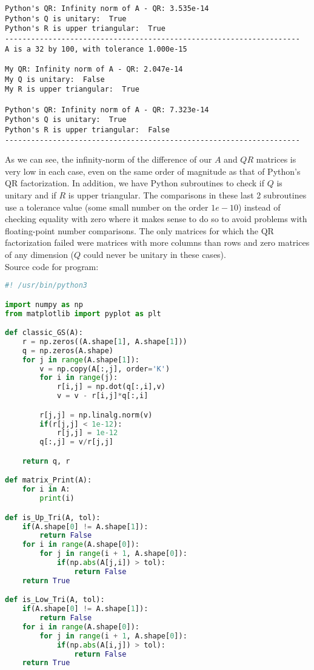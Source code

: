 \documentclass{article}
\begin{document}
\begin{large}
\begin{lstlisting}
Python's QR: Infinity norm of A - QR: 3.535e-14
Python's Q is unitary:  True
Python's R is upper triangular:  True
--------------------------------------------------------------------
A is a 32 by 100, with tolerance 1.000e-15

My QR: Infinity norm of A - QR: 2.047e-14
My Q is unitary:  False
My R is upper triangular:  True

Python's QR: Infinity norm of A - QR: 7.323e-14
Python's Q is unitary:  True
Python's R is upper triangular:  False
--------------------------------------------------------------------
\end{lstlisting}
As we can see, the infinity-norm of the difference of our $A$ and $QR$ matrices is very low in each case, even on the same order of magnitude as that of Python's QR factorization. In addition, we have Python subroutines to check if $Q$ is unitary and if $R$ is upper triangular. The comparisons in these last 2 subroutines use a tolerance value (some small number on the order $1e-10$) instead of checking equality with zero where it makes sense to do so to avoid problems with floating-point number comparisons. The only matrices for which the QR factorization failed were matrices with more columns than rows and zero matrices of any dimension ($Q$ could never be unitary in these cases). \\
\noindent\makebox[\linewidth]{\rule{\paperwidth}{0.4pt}}
Source code for program:
\begin{lstlisting}[language=python]
#! /usr/bin/python3

import numpy as np
from matplotlib import pyplot as plt

def classic_GS(A):
	r = np.zeros((A.shape[1], A.shape[1]))
	q = np.zeros(A.shape)
	for j in range(A.shape[1]):
		v = np.copy(A[:,j], order='K')
		for i in range(j):
			r[i,j] = np.dot(q[:,i],v)
			v = v - r[i,j]*q[:,i]

		r[j,j] = np.linalg.norm(v)
		if(r[j,j] < 1e-12):
			r[j,j] = 1e-12
		q[:,j] = v/r[j,j]

	return q, r

def matrix_Print(A):
	for i in A:
		print(i)

def is_Up_Tri(A, tol):
	if(A.shape[0] != A.shape[1]):
		return False
	for i in range(A.shape[0]):
		for j in range(i + 1, A.shape[0]):
			if(np.abs(A[j,i]) > tol):
				return False
	return True

def is_Low_Tri(A, tol):
	if(A.shape[0] != A.shape[1]):
		return False
	for i in range(A.shape[0]):
		for j in range(i + 1, A.shape[0]):
			if(np.abs(A[i,j]) > tol):
				return False
	return True


\end{lstlisting}
\end{large}
\end{document}

